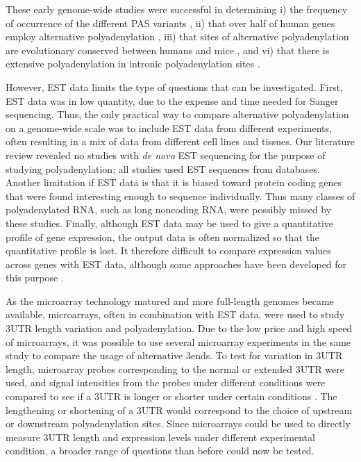 These early genome-wide studies were successful in determining i) the frequency
of occurrence of the different PAS variants \cite{beaudoing_patterns_2000}, ii)
that over half of human genes employ alternative polyadenylation
\cite{tian_large-scale_2005}, iii) that sites of alternative polyadenylation
are evolutionary conserved between humans and mice
\cite{tian_large-scale_2005}, and vi) that there is extensive polyadenylation
in intronic polyadenylation sites \cite{tian_widespread_2007}.

However, EST data limits the type of questions that can be investigated. First,
EST data was in low quantity, due to the expense and time needed for Sanger
sequencing. Thus, the only practical way to compare alternative polyadenylation
on a genome-wide scale was to include EST data from different experiments,
often resulting in a mix of data from different cell lines and tissues. Our
literature review revealed no studies with \textit{de novo} EST sequencing for
the purpose of studying polyadenylation; all studies used EST sequences from
databases. Another limitation if EST data is that it is biased toward protein
coding genes that were found interesting enough to sequence individually. Thus
many classes of polyadenylated RNA, such as long noncoding RNA, were possibly
missed by these studies. Finally, although EST data may be used to give a
quantitative profile of gene expression, the output data is often normalized so
that the quantitative profile is lost. It therefore difficult to compare
expression values across genes with EST data, although some approaches have
been developed for this purpose \cite{liu_quantitative_2006}.

As the microarray technology matured and more full-length genomes became
available, microarrays, often in combination with EST data, were used to study
3\p UTR length variation and polyadenylation. Due to the low price and high
speed of microarrays, it was possible to use several microarray experiments in
the same study to compare the usage of alternative 3\p ends. To test for
variation in 3\p UTR length, microarray probes corresponding to the normal or
extended 3\p UTR were used, and signal intensities from the probes under
different conditions were compared to see if a 3\p UTR is longer or shorter
under certain conditions \cite{sandberg_proliferating_2008,
ji_progressive_2009}. The lengthening or shortening of a 3\p UTR would
correspond to the choice of upstream or downstream polyadenylation sites. Since
microarrays could be used to directly measure 3\p UTR length and expression
levels under different experimental condition, a broader range of questions
than before could now be tested. 

